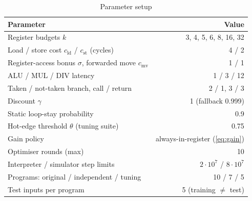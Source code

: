 \documentclass{ieeeaccess}
\newcommand{\cld}{c_{\mathrm{ld}}}
\newcommand{\cst}{c_{\mathrm{st}}}
\newcommand{\csv}{\sigma}
\newcommand{\cmv}{c_{\mathrm{mv}}}
\begin{document}
\begin{table}[t]
\centering
\caption{Parameter setup}
\label{tab:params}
\footnotesize
\begin{tabular}{@{}lr@{}}
\toprule
Parameter & Value \\
\midrule
Register budgets $k$ & 3, 4, 5, 6, 8, 16, 32 \\
Load / store cost $\cld$ / $\cst$ (cycles) & 4 / 2 \\
Register-access bonus $\csv$, forwarded move $\cmv$ & 1 / 1 \\
ALU / MUL / DIV latency & 1 / 3 / 12 \\
Taken / not-taken branch, call / return & 2 / 1, 3 / 3 \\
Discount $\gamma$ & 1 (fallback 0.999) \\
Static loop-stay probability & 0.9 \\
Hot-edge threshold $\theta$ (tuning suite) & 0.75 \\
Gain policy & always-in-register (\ref{eq:gain}) \\
Optimiser rounds (max) & 10 \\
Interpreter / simulator step limits & $2\cdot10^7$ / $8\cdot10^7$ \\
Programs: original / independent / tuning & 10 / 7 / 5 \\
Test inputs per program & 5 (training $\neq$ test) \\
\bottomrule
\end{tabular}
\end{table}
\end{document}
